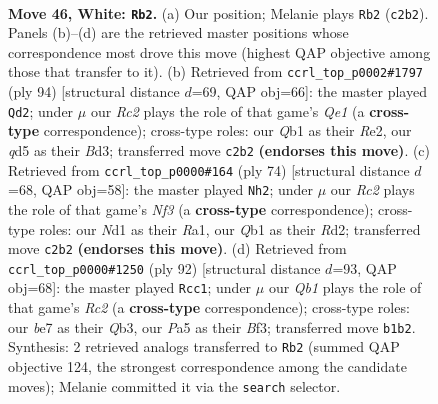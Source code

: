 \documentclass[11pt]{article}
\begin{document}
\clearpage

\begin{figure}[p]\centering
\begin{subfigure}{0.46\textwidth}\centering
\resizebox{\linewidth}{!}{%
\newchessgame
\chessboard[
  setfen={nr2n1k1/4b3/p4r2/P1pq1p1p/3p1Pp1/1P4P1/2RBP2P/RQ1NN1K1 w - - 8 46},
  showmover=false,
  pgfstyle=straightmove, color=movearrow, markmove={c2-b2}
]}
\caption{}
\end{subfigure}\hfill
\begin{subfigure}{0.46\textwidth}\centering
\resizebox{\linewidth}{!}{%
\newchessgame
\chessboard[
  setfen={1r2r1k1/p2b1n2/P1p2qp1/2Pp1p1p/1p3P2/1P1BPN1P/4R1P1/2R1Q2K w - - 25 48},
  showmover=false,
  pgfstyle=straightmove, color=movearrow, markmove={e1-d2}
]}
\caption{}
\end{subfigure}
\\[4pt]
\begin{subfigure}{0.46\textwidth}\centering
\resizebox{\linewidth}{!}{%
\newchessgame
\chessboard[
  setfen={2r3k1/p3q2p/1pnr1bpP/2p1p3/P1P1P3/3PBNP1/3RQ1K1/R7 w - - 0 38},
  showmover=false,
  pgfstyle=straightmove, color=movearrow, markmove={f3-h2}
]}
\caption{}
\end{subfigure}\hfill
\begin{subfigure}{0.46\textwidth}\centering
\resizebox{\linewidth}{!}{%
\newchessgame
\chessboard[
  setfen={bqr1n1k1/5pp1/rp1pp2p/1N6/1PP1PP2/1Q3B1P/2R3P1/3R3K w - - 39 47},
  showmover=false,
  pgfstyle=straightmove, color=movearrow, markmove={c2-c1}
]}
\caption{}
\end{subfigure}
\caption{\textbf{Move 46, White: \texttt{Rb2}.} (a) Our position; Melanie plays \texttt{Rb2} (\texttt{c2b2}). Panels (b)--(d) are the retrieved master positions whose correspondence most drove this move (highest QAP objective among those that transfer to it). (b) Retrieved from \texttt{ccrl\_top\_p0002\#1797} (ply 94) [structural distance $d$=69, QAP obj=66]: the master played \texttt{Qd2}; under $\mu$ our \emph{Rc2} plays the role of that game's \emph{Qe1} (a \textbf{cross-type} correspondence); cross-type roles: our \emph{Q}b1 as their \emph{R}e2, our \emph{q}d5 as their \emph{B}d3; transferred move \texttt{c2b2} \textbf{(endorses this move)}. (c) Retrieved from \texttt{ccrl\_top\_p0000\#164} (ply 74) [structural distance $d$=68, QAP obj=58]: the master played \texttt{Nh2}; under $\mu$ our \emph{Rc2} plays the role of that game's \emph{Nf3} (a \textbf{cross-type} correspondence); cross-type roles: our \emph{N}d1 as their \emph{R}a1, our \emph{Q}b1 as their \emph{R}d2; transferred move \texttt{c2b2} \textbf{(endorses this move)}. (d) Retrieved from \texttt{ccrl\_top\_p0000\#1250} (ply 92) [structural distance $d$=93, QAP obj=68]: the master played \texttt{Rcc1}; under $\mu$ our \emph{Qb1} plays the role of that game's \emph{Rc2} (a \textbf{cross-type} correspondence); cross-type roles: our \emph{b}e7 as their \emph{Q}b3, our \emph{P}a5 as their \emph{B}f3; transferred move \texttt{b1b2}. Synthesis: 2 retrieved analogs transferred to \texttt{Rb2} (summed QAP objective 124, the strongest correspondence among the candidate moves); Melanie committed it via the \texttt{search} selector.}
\label{fig:thought-m90}
\end{figure}
\end{document}
